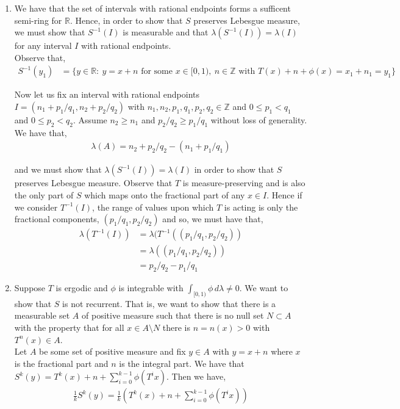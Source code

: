 \documentclass[12pt]{article}
\begin{document}
\begin{enumerate}[label=\alph*)]

\item We have that the set of intervals with rational endpoints forms a sufficent semi-ring for $\mathbb{R}$. Hence, in order to show that $S$ preserves Lebesgue measure, we must show that $S^{-1}(I)$ is measurable and that $\lambda(S^{-1}(I)) = \lambda(I)$ for any interval $I$ with rational endpoints.\\

Observe that,
\begin{align*}
S^{-1}(y_1) &= \{y \in \mathbb{R}: \ y = x + n \text{ for some } x \in [0, 1), \ n \in \mathbb{Z} \text{ with } T(x) + n + \phi(x) = x_1 + n_1 = y_1\}
\end{align*}

Now let us fix an interval with rational endpoints $I = (n_1 + p_1/q_1, n_2 + p_2/q_2)$ with $n_1, n_2, p_1, q_1, p_2, q_2 \in \mathbb{Z}$ and $0 \leq p_1 < q_1$ and $0 \leq p_2 < q_2$. Assume $n_2 \geq n_1$ and $p_2/q_2 \geq p_1/q_1$ without loss of generality.  We have that,
\begin{align*}
\lambda(A) = n_2 + p_2/q_2 - (n_1 + p_1/q_1)
\end{align*}

and we must show that $\lambda(S^{-1}(I)) = \lambda(I)$ in order to show that $S$ preserves Lebesgue measure. Observe that $T$ is measure-preserving and is also the only part of $S$ which maps onto the fractional part of any $x \in I$. Hence if we consider $T^{-1}(I)$, the range of values upon which $T$ is acting is only the fractional components, $(p_1/q_1, p_2/q_2)$ and so, we must have that,
\begin{align*}
\lambda(T^{-1}(I)) &= \lambda(T^{-1}((p_1/q_1, p_2/q_2))\\
&= \lambda((p_1/q_1, p_2/q_2))\\
&= p_2/q_2 - p_1/q_1
\end{align*}


\item Suppose $T$ is ergodic and $\phi$ is integrable with $\int_{[0,1)} \phi \, d\lambda \neq 0$. We want to show that $S$ is not recurrent. That is, we want to show that there is a measurable set $A$ of positive measure such that there is no null set $N \subset A$ with the property that for all $x \in A \setminus N$ there is $n = n(x) > 0$ with $T^n(x) \in A$.\\

Let $A$ be some set of positive measure and fix $y \in A$ with $y = x + n$ where $x$ is the fractional part and $n$ is the integral part. We have that $S^k(y) = T^k(x) + n + \sum_{i=0}^{k-1} \phi(T^ix)$. Then we have,
\begin{align*}
\frac{1}{k} S^k(y) = \frac{1}{k} (T^k(x) + n + \sum_{i=0}^{k-1} \phi(T^ix))
\end{align*}


\end{enumerate}
\end{document}

